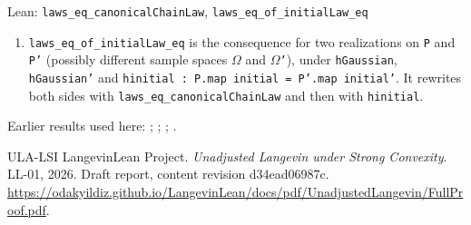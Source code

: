 \documentclass[11pt,a4paper]{article}
\begin{document}
\begin{leanbox}{Lean: \texttt{laws\_\allowbreak{}eq\_\allowbreak{}canonicalChainLaw}, \texttt{laws\_\allowbreak{}eq\_\allowbreak{}of\_\allowbreak{}initialLaw\_\allowbreak{}eq}}
\begin{enumerate}
\begin{itemize}
\item \texttt{h\allowbreak{}Gaussian.\allowbreak{}noise\allowbreak{}Path\_\allowbreak{}law P initial noise} replaces the path law by \(\mathcal G\).

\end{itemize}


\item \texttt{laws\_\allowbreak{}eq\_\allowbreak{}of\_\allowbreak{}initial\allowbreak{}Law\_\allowbreak{}eq} is the consequence for two realizations on \texttt{P} and \texttt{P'} (possibly different sample spaces \texttt{\ensuremath{\Omega}} and \texttt{\ensuremath{\Omega}'}), under \texttt{h\allowbreak{}Gaussian}, \texttt{h\allowbreak{}Gaussian'} and \texttt{hinitial : P.\allowbreak{}map initial = P'.\allowbreak{}map initial'}. It rewrites both sides with \texttt{laws\_\allowbreak{}eq\_\allowbreak{}canonical\allowbreak{}Chain\allowbreak{}Law} and then with \texttt{hinitial}.

\end{enumerate}
\end{leanbox}


Earlier results used here: \cite[Section~3.20.5]{LangevinLean2026ULASC}; \cite[Section~3.20.7]{LangevinLean2026ULASC}; \cite[Section~3.23.1]{LangevinLean2026ULASC}; \cite[Section~3.23.2]{LangevinLean2026ULASC}.

\begin{thebibliography}{ULA-LSI}
LangevinLean Project. \emph{Unadjusted Langevin under Strong Convexity}. LL-01, 2026. Draft report, content revision d34ead06987c. \url{https://odakyildiz.github.io/LangevinLean/docs/pdf/UnadjustedLangevin/FullProof.pdf}.
\end{thebibliography}
\end{document}
